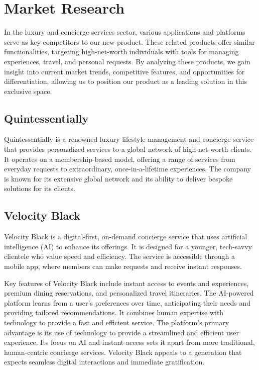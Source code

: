 \section{Market Research}
\label{section:market-research}
In the luxury and concierge services sector, various applications and platforms serve as key competitors to our new product. These related products offer similar functionalities, targeting high-net-worth individuals with tools for managing experiences, travel, and personal requests. By analyzing these products, we gain insight into current market trends, competitive features, and opportunities for differentiation, allowing us to position our product as a leading solution in this exclusive space.

\subsection{Quintessentially}
Quintessentially \cite{quintessentially2025about} is a renowned luxury lifestyle management and concierge service that provides personalized services to a global network of high-net-worth clients. It operates on a membership-based model, offering a range of services from everyday requests to extraordinary, once-in-a-lifetime experiences. The company is known for its extensive global network and its ability to deliver bespoke solutions for its clients.


\subsection{Velocity Black}
Velocity Black \cite{velocityblack2025membership} is a digital-first, on-demand concierge service that uses artificial intelligence (AI) to enhance its offerings. It is designed for a younger, tech-savvy clientele who value speed and efficiency. The service is accessible through a mobile app, where members can make requests and receive instant responses.


Key features of Velocity Black include instant access to events and experiences, premium dining reservations, and personalized travel itineraries. The AI-powered platform learns from a user's preferences over time, anticipating their needs and providing tailored recommendations. It combines human expertise with technology to provide a fast and efficient service.
The platform's primary advantage is its use of technology to provide a streamlined and efficient user experience. Its focus on AI and instant access sets it apart from more traditional, human-centric concierge services. Velocity Black appeals to a generation that expects seamless digital interactions and immediate gratification.

